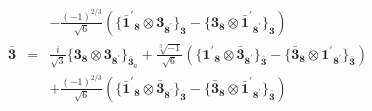 \documentclass[english]{article}
\newcommand{\subcg}[3]{\big\{ {#1}\otimes{#2}\big\}^{}_{#3}}
\newcommand{\rep}[1]{\mathbf{#1}}
\begin{document}
\begin{itemize}
\begin{eqnarray*}
 & & -\frac{(-1)^{2/3}}{\sqrt{6}}\left(\subcg{\rep{\bar{1}^{\prime}}_{\rep{8}}}{\rep{3}_{\rep{8^{\prime}}}}{\rep{3}}-\subcg{\rep{3}_{\rep{8}}}{\rep{\bar{1}^{\prime}}_{\rep{8^{\prime}}}}{\rep{3}}\right)
\\
\rep{\bar{3}} &=& \frac{i}{\sqrt{3}}\subcg{\rep{3}_{\rep{8}}}{\rep{3}_{\rep{8^{\prime}}}}{\rep{\bar{3}}_{a}}+\frac{\sqrt[3]{-1}}{\sqrt{6}}\left(\subcg{\rep{1^{\prime}}_{\rep{8}}}{\rep{\bar{3}}_{\rep{8^{\prime}}}}{\rep{\bar{3}}}-\subcg{\rep{\bar{3}}_{\rep{8}}}{\rep{1^{\prime}}_{\rep{8^{\prime}}}}{\rep{\bar{3}}}\right) \\ 
 & & +\frac{(-1)^{2/3}}{\sqrt{6}}\left(\subcg{\rep{\bar{1}^{\prime}}_{\rep{8}}}{\rep{\bar{3}}_{\rep{8^{\prime}}}}{\rep{\bar{3}}}-\subcg{\rep{\bar{3}}_{\rep{8}}}{\rep{\bar{1}^{\prime}}_{\rep{8^{\prime}}}}{\rep{\bar{3}}}\right)
\end{eqnarray*}
\end{itemize}
\end{document}
